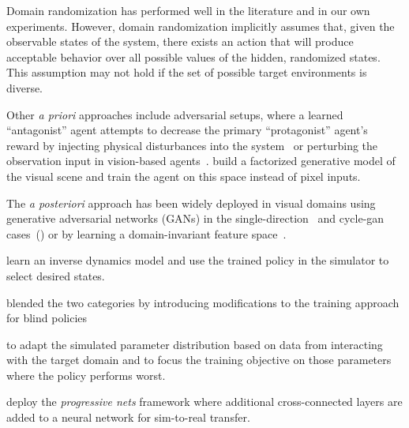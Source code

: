 \documentclass{article}
\newcommand{\TODO}[1]{}
\begin{document}
Domain randomization has performed well in the literature and in our own experiments.
However, domain randomization implicitly assumes that, given the observable states of the system,
there exists an action that will produce acceptable behavior over all possible values of the hidden, randomized states.
This assumption may not hold if the set of possible target environments is diverse.

Other \emph{a priori} approaches include adversarial setups,
where a learned ``antagonist'' agent attempts to decrease the primary ``protagonist'' agent's reward
by injecting physical disturbances into the system~\citep{pinto-robust-adversarial-RL}
or perturbing the observation input in vision-based agents~\citep{huang-adversarial-attacks}.
\citet{higgins-DARLA} build a factorized generative model of the visual scene
and train the agent on this space instead of pixel inputs.


The \emph{a posteriori} approach has been widely deployed in visual domains
using generative adversarial networks (GANs) in the single-direction~\citep{bousmalis-domain-gan-cvpr17}
and cycle-gan cases~(\TODO{cite})
or by learning a domain-invariant feature space~\citep{bousmalis-domainseparation-nips16}.

\citet{christiano-deep-inverse-dynamics-corr16} learn an inverse dynamics model and use the trained policy in the simulator to select desired states.
\TODO{characterize better.}

\citet{rajeswaran-epopt-corr16} blended the two categories by introducing
modifications to the training approach for blind policies
\TODO{introduce terminology for ``blind'' policies}
to adapt the simulated parameter distribution based on data from interacting with the target domain
and to focus the training objective on those parameters where the policy performs worst.
\TODO{run-on sentence}


\citet{rusu-progressive-nets} deploy the \emph{progressive nets} framework
where additional cross-connected layers are added to a neural network
for sim-to-real transfer.
\end{document}
